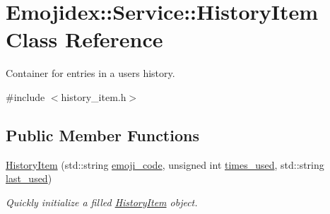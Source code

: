 \hypertarget{classEmojidex_1_1Service_1_1HistoryItem}{}\section{Emojidex\+:\+:Service\+:\+:History\+Item Class Reference}
\label{classEmojidex_1_1Service_1_1HistoryItem}


Container for entries in a users history.  




{\ttfamily \#include $<$history\+\_\+item.\+h$>$}

\subsection*{Public Member Functions}
\begin{DoxyCompactItemize}
\item 
\hyperlink{classEmojidex_1_1Service_1_1HistoryItem_a83d81f8c40be75796eabea667e1d7400}{History\+Item} (std\+::string \hyperlink{classEmojidex_1_1Service_1_1HistoryItem_a98d6de7de108b4154cf4a47585af2489}{emoji\+\_\+code}, unsigned int \hyperlink{classEmojidex_1_1Service_1_1HistoryItem_a1cbf38f7c53d500fc9be47dfdeed167d}{times\+\_\+used}, std\+::string \hyperlink{classEmojidex_1_1Service_1_1HistoryItem_ac023cfba66fd6d1122d7d7b99009d441}{last\+\_\+used})\hypertarget{classEmojidex_1_1Service_1_1HistoryItem_a83d81f8c40be75796eabea667e1d7400}{}\label{classEmojidex_1_1Service_1_1HistoryItem_a83d81f8c40be75796eabea667e1d7400}

\begin{DoxyCompactList}\small\item\em Quickly initialize a filled \hyperlink{classEmojidex_1_1Service_1_1HistoryItem}{History\+Item} object. \end{DoxyCompactList}\end{DoxyCompactItemize}
